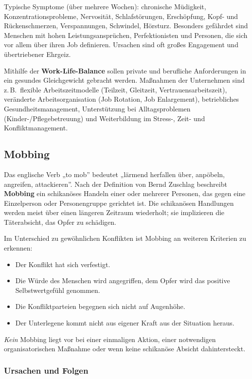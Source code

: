 \documentclass[11pt, a4paper]{article}
\begin{document}
Typische Symptome (über mehrere Wochen): chronische Müdigkeit, Konzentrationsprobleme,
Nervosität, Schlafstörungen, Erschöpfung, Kopf- und Rückenschmerzen, Verspannungen,
Schwindel, Hörsturz. Besonders gefährdet sind Menschen mit hohen Leistungsansprüchen,
Perfektionisten und Personen, die sich vor allem über ihren Job definieren. Ursachen sind
oft großes Engagement und übertriebener Ehrgeiz.

Mithilfe der \textbf{Work-Life-Balance} sollen private und berufliche Anforderungen in ein
gesundes Gleichgewicht gebracht werden. Maßnahmen der Unternehmen sind z.\,B.\ flexible
Arbeitszeitmodelle (Teilzeit, Gleitzeit, Vertrauensarbeitszeit), veränderte
Arbeitsorganisation (Job Rotation, Job Enlargement), betriebliches Gesundheitsmanagement,
Unterstützung bei Alltagsproblemen (Kinder-/Pflegebetreuung) und Weiterbildung im Stress-,
Zeit- und Konfliktmanagement.

\subsection{Mobbing}

Das englische Verb „to mob” bedeutet „lärmend herfallen über, anpöbeln, angreifen,
attackieren”. Nach der Definition von Bernd Zuschlag beschreibt \textbf{Mobbing} ein
schikanöses Handeln einer oder mehrerer Personen, das gegen eine Einzelperson oder
Personengruppe gerichtet ist. Die schikanösen Handlungen werden meist über einen längeren
Zeitraum wiederholt; sie implizieren die Täterabsicht, das Opfer zu schädigen.

Im Unterschied zu gewöhnlichen Konflikten ist Mobbing an weiteren Kriterien zu erkennen:

\begin{itemize}
  \item Der Konflikt hat sich verfestigt.
  \item Die Würde des Menschen wird angegriffen, dem Opfer wird das positive Selbstwertgefühl genommen.
  \item Die Konfliktparteien begegnen sich nicht auf Augenhöhe.
  \item Der Unterlegene kommt nicht aus eigener Kraft aus der Situation heraus.
\end{itemize}

\emph{Kein} Mobbing liegt vor bei einer einmaligen Aktion, einer notwendigen
organisatorischen Maßnahme oder wenn keine schikanöse Absicht dahintersteckt.

\subsubsection{Ursachen und Folgen}
\end{document}

